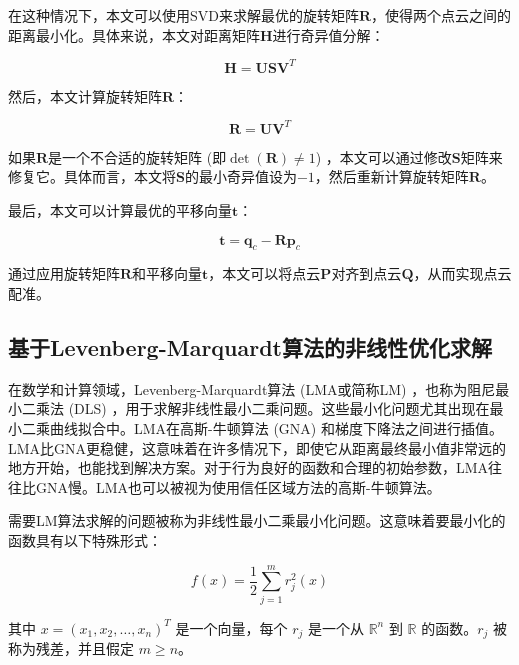 在这种情况下，本文可以使用SVD来求解最优的旋转矩阵$\boldsymbol{R}$，使得两个点云之间的距离最小化。具体来说，本文对距离矩阵$\boldsymbol{H}$进行奇异值分解：

\begin{equation}
\boldsymbol{H} = \boldsymbol{U} \boldsymbol{S} \boldsymbol{V}^T
\end{equation}

然后，本文计算旋转矩阵$\boldsymbol{R}$：

\begin{equation}
\boldsymbol{R} = \boldsymbol{U} \boldsymbol{V}^T
\end{equation}

如果$\boldsymbol{R}$是一个不合适的旋转矩阵 (即$\det(\boldsymbol{R})\neq 1$) ，本文可以通过修改$\boldsymbol{S}$矩阵来修复它。具体而言，本文将$\boldsymbol{S}$的最小奇异值设为$-1$，然后重新计算旋转矩阵$\boldsymbol{R}$。

最后，本文可以计算最优的平移向量$\boldsymbol{t}$：

\begin{equation}
\boldsymbol{t} = \boldsymbol{q}_c - \boldsymbol{R} \boldsymbol{p}_c
\end{equation}

通过应用旋转矩阵$\boldsymbol{R}$和平移向量$\boldsymbol{t}$，本文可以将点云$\boldsymbol{P}$对齐到点云$\boldsymbol{Q}$，从而实现点云配准。

\subsection{基于Levenberg-Marquardt算法的非线性优化求解}
在数学和计算领域，Levenberg-Marquardt算法 (LMA或简称LM) \cite{levenberg1944method} ，也称为阻尼最小二乘法 (DLS) ，用于求解非线性最小二乘问题。这些最小化问题尤其出现在最小二乘曲线拟合中。LMA在高斯-牛顿算法 (GNA) 和梯度下降法之间进行插值。LMA比GNA更稳健，这意味着在许多情况下，即使它从距离最终最小值非常远的地方开始，也能找到解决方案。对于行为良好的函数和合理的初始参数，LMA往往比GNA慢。LMA也可以被视为使用信任区域方法的高斯-牛顿算法。

需要LM算法求解的问题被称为非线性最小二乘最小化问题。这意味着要最小化的函数具有以下特殊形式：

\begin{equation}
f(x) = \frac{1}{2} \sum_{j=1}^{m} r_j^2(x)
\end{equation}

其中 $x = (x_1, x_2, \dots, x_n)^T$ 是一个向量，每个 $r_j$ 是一个从 $\mathbb{R}^n$ 到 $\mathbb{R}$ 的函数。$r_j$ 被称为残差，并且假定 $m \geq n$。


